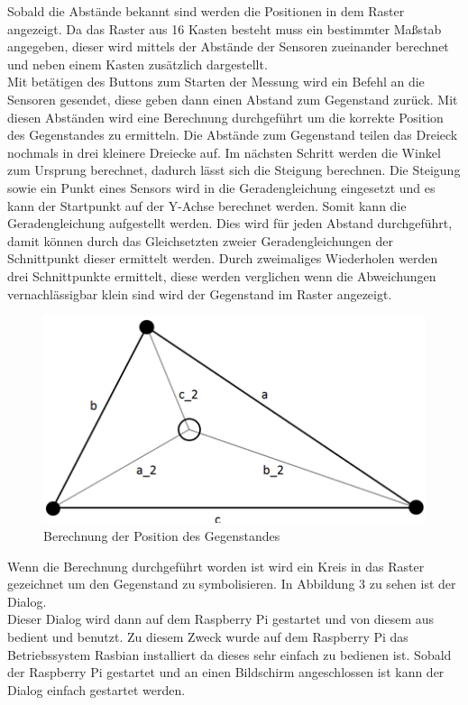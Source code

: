 Sobald die Abstände bekannt sind werden die Positionen in dem Raster angezeigt. Da das Raster aus 16 Kasten besteht muss ein bestimmter Maßstab angegeben, dieser wird mittels der Abstände der Sensoren zueinander berechnet und neben einem Kasten zusätzlich dargestellt.\\
Mit betätigen des Buttons zum Starten der Messung wird ein Befehl an die Sensoren gesendet, diese geben dann einen Abstand zum Gegenstand zurück. Mit diesen Abständen wird eine Berechnung durchgeführt um die korrekte Position des Gegenstandes zu ermitteln. Die Abstände zum Gegenstand teilen das Dreieck nochmals in drei kleinere Dreiecke auf. Im nächsten Schritt werden die Winkel zum Ursprung berechnet, dadurch lässt sich die Steigung berechnen. Die Steigung sowie ein Punkt eines Sensors wird in die Geradengleichung eingesetzt und es kann der Startpunkt auf der Y-Achse berechnet werden. Somit kann die Geradengleichung aufgestellt werden. Dies wird für jeden Abstand durchgeführt, damit können durch das Gleichsetzten zweier Geradengleichungen der Schnittpunkt dieser ermittelt werden. Durch zweimaliges Wiederholen werden drei Schnittpunkte ermittelt, diese werden verglichen wenn die Abweichungen vernachlässigbar klein sind wird der Gegenstand im Raster angezeigt.
\begin{figure}[H]
	\centering
	\includegraphics[scale=1]{images/gui/02.png}
	\caption{Berechnung der Position des Gegenstandes} \label{img:gui2}
\end{figure}

Wenn die Berechnung durchgeführt worden ist wird ein Kreis in das Raster gezeichnet um den Gegenstand zu symbolisieren. In Abbildung 3 zu sehen ist der Dialog.\\
Dieser Dialog wird dann auf dem Raspberry Pi gestartet und von diesem aus bedient und benutzt. Zu diesem Zweck wurde auf dem Raspberry Pi das Betriebssystem Rasbian installiert da dieses sehr einfach zu bedienen ist. Sobald der Raspberry Pi gestartet und an einen Bildschirm angeschlossen ist kann der Dialog einfach gestartet werden.

